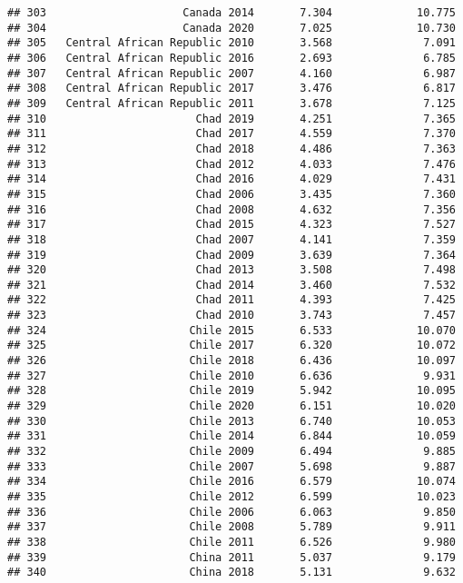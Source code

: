\documentclass[
]{article}
\begin{document}
\begin{verbatim}
## 303                     Canada 2014       7.304             10.775
## 304                     Canada 2020       7.025             10.730
## 305   Central African Republic 2010       3.568              7.091
## 306   Central African Republic 2016       2.693              6.785
## 307   Central African Republic 2007       4.160              6.987
## 308   Central African Republic 2017       3.476              6.817
## 309   Central African Republic 2011       3.678              7.125
## 310                       Chad 2019       4.251              7.365
## 311                       Chad 2017       4.559              7.370
## 312                       Chad 2018       4.486              7.363
## 313                       Chad 2012       4.033              7.476
## 314                       Chad 2016       4.029              7.431
## 315                       Chad 2006       3.435              7.360
## 316                       Chad 2008       4.632              7.356
## 317                       Chad 2015       4.323              7.527
## 318                       Chad 2007       4.141              7.359
## 319                       Chad 2009       3.639              7.364
## 320                       Chad 2013       3.508              7.498
## 321                       Chad 2014       3.460              7.532
## 322                       Chad 2011       4.393              7.425
## 323                       Chad 2010       3.743              7.457
## 324                      Chile 2015       6.533             10.070
## 325                      Chile 2017       6.320             10.072
## 326                      Chile 2018       6.436             10.097
## 327                      Chile 2010       6.636              9.931
## 328                      Chile 2019       5.942             10.095
## 329                      Chile 2020       6.151             10.020
## 330                      Chile 2013       6.740             10.053
## 331                      Chile 2014       6.844             10.059
## 332                      Chile 2009       6.494              9.885
## 333                      Chile 2007       5.698              9.887
## 334                      Chile 2016       6.579             10.074
## 335                      Chile 2012       6.599             10.023
## 336                      Chile 2006       6.063              9.850
## 337                      Chile 2008       5.789              9.911
## 338                      Chile 2011       6.526              9.980
## 339                      China 2011       5.037              9.179
## 340                      China 2018       5.131              9.632

\end{verbatim}
\end{document}
